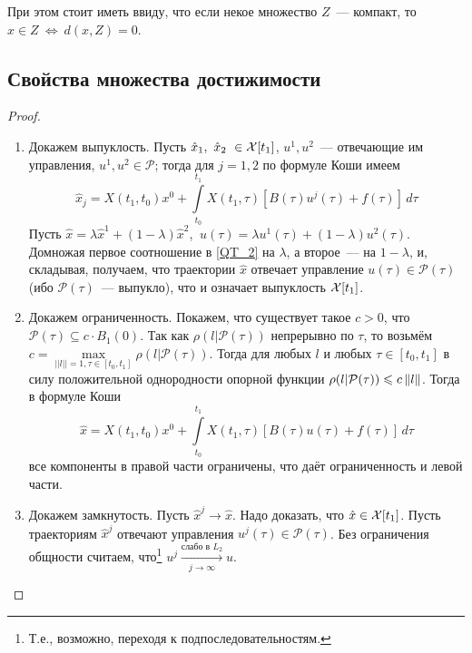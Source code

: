 При этом стоит иметь ввиду,
что если некое множество $Z$~--- компакт,
то $x \in Z\ \Leftrightarrow\ d(x,Z)=0$.

\subsection{Свойства множества достижимости}
{
}
\begin{proof}
  \begin{enumerate}
    \item
    Докажем выпуклость.
    Пусть $\hat{x}_1,\ \hat{x}_2\ \in\soa[t_1]$,
    $u^1, u^2$~--- отвечающие им управления,
    $u^1,u^2 \in \mathcal{P}$;
    тогда для $j=1, 2$ по формуле Коши имеем
    \begin{equation}\label{QT_2}
      \hat{x}_j = X(t_1, t_0)x^0 +
          \int\limits_{t_0}^{t_1}X(t_1, \tau)
                                 [B(\tau)u^j(\tau) + f(\tau)]\,d\tau
    \end{equation}
    Пусть
    $\hat{x} = \lambda \hat x^1 + (1 - \lambda)\hat{x}^2$,
    $\ u(\tau) = \lambda u^1(\tau) + (1 - \lambda)u^2(\tau)$.
    Домножая первое соотношение в \eqref{QT_2} на $\lambda$,
    а второе~--- на $1 - \lambda$, и, складывая, получаем,
    что траектории $\hat{x}$ отвечает управление
    $u(\tau) \in \mathcal{P(\tau)}$
    (ибо $\mathcal{P}(\tau)$~--- выпукло),
    что и означает выпуклость $\mathcal{X}[t_1]$.
    \item
    Докажем ограниченность.
    Покажем, что существует такое $c > 0$,
    что $\mathcal{P}(\tau) \subseteq c \cdot B_1(0)$.
    Так как $\rho(l|\mathcal{P}(\tau))$
    непрерывно по $\tau$, то возьмём
    $c = \max\limits_{||l||=1,\tau\in[t_0,t_1]}\rho(l|\mathcal{P}(\tau))$.
    Тогда для любых $l$ и любых $\tau\in[t_0,t_1]$ в силу
    положительной однородности опорной функции
    $\rho(l|\mathcal{P}(\tau)) \leqslant c\left\| l \right\|$.
    Тогда в формуле Коши
    \begin{equation*}
      \hat{x} = X(t_1, t_0)x^0 +
          \int\limits_{t_0}^{t_1}X(t_1, \tau)
                                 [B(\tau)u(\tau) + f(\tau)]\,d\tau
    \end{equation*}
    все компоненты в правой части ограничены,
    что даёт ограниченность и левой части.
    \item
    Докажем замкнутость.
    Пусть $\hat{x}^j \to \hat{x}$.
    Надо доказать, что $\hat{x} \in \mathcal{X}[t_1]$.
    Пусть траекториям $\hat{x}^j$ отвечают управления
    $u^j(\tau) \in \mathcal{P}(\tau)$.
    Без ограничения общности считаем,
    что\footnote{Т.е., возможно, переходя к подпоследовательностям.}
    $u^j \xrightarrow[j \rightarrow \infty]{\text{слабо в } L_2}u$. 


\end{enumerate}
\end{proof}
